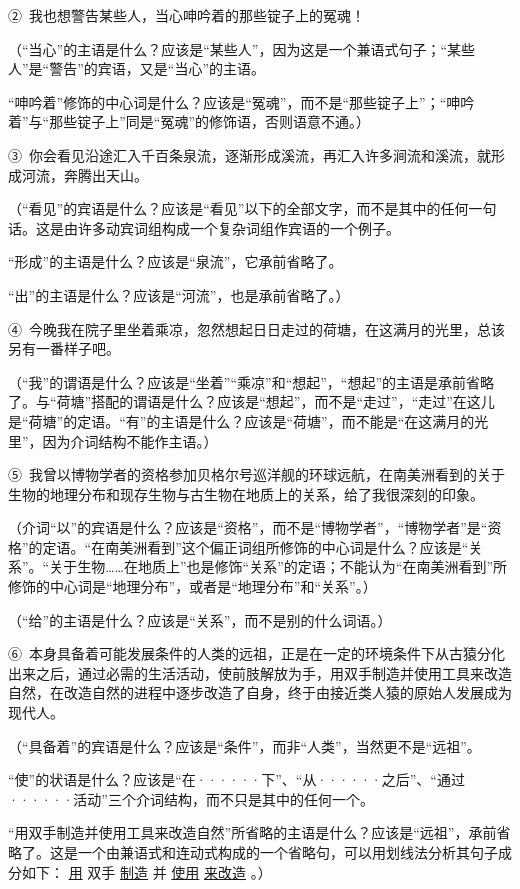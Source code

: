 ②\ 我也想警告某些人，当心呻吟着的那些锭子上的冤魂！

（“当心”的主语是什么？应该是“某些人”，因为这是一个兼语式句子；“某些人”是“警告”的宾语，又是“当心”的主语。

“呻吟着”修饰的中心词是什么？应该是“冤魂”，而不是“那些锭子上”；“呻吟着”与“那些锭子上”同是“冤魂”的修饰语，否则语意不通。）

③\ 你会看见沿途汇入千百条泉流，逐渐形成溪流，再汇入许多涧流和溪流，就形成河流，奔腾出天山。

（“看见”的宾语是什么？应该是“看见”以下的全部文字，而不是其中的任何一句话。这是由许多动宾词组构成一个复杂词组作宾语的一个例子。

“形成”的主语是什么？应该是“泉流”，它承前省略了。

“出”的主语是什么？应该是“河流”，也是承前省略了。）

④\ 今晚我在院子里坐着乘凉，忽然想起日日走过的荷塘，在这满月的光里，总该另有一番样子吧。

（“我”的谓语是什么？应该是“坐着”“乘凉”和“想起”，“想起”的主语是承前省略了。与“荷塘”搭配的谓语是什么？应该是“想起”，而不是“走过”，“走过”在这儿是“荷塘”的定语。“有”的主语是什么？应该是“荷塘”，而不能是“在这满月的光里”，因为介词结构不能作主语。）

⑤\ 我曾以博物学者的资格参加贝格尔号巡洋舰的环球远航，在南美洲看到的关于生物的地理分布和现存生物与古生物在地质上的关系，给了我很深刻的印象。

（介词“以”的宾语是什么？应该是“资格”，而不是“博物学者”，“博物学者”是“资格”的定语。“在南美洲看到”这个偏正词组所修饰的中心词是什么？应该是“关系”。“关于生物……在地质上”也是修饰“关系”的定语；不能认为“在南美洲看到”所修饰的中心词是“地理分布”，或者是“地理分布”和“关系”。）

（“给”的主语是什么？应该是“关系”，而不是别的什么词语。）

⑥\ 本身具备着可能发展条件的人类的远祖，正是在一定的环境条件下从古猿分化出来之后，通过必需的生活活动，使前肢解放为手，用双手制造并使用工具来改造自然，在改造自然的进程中逐步改造了自身，终于由接近类人猿的原始人发展成为现代人。

（“具备着”的宾语是什么？应该是“条件”，而非“人类”，当然更不是“远祖”。

“使”的状语是什么？应该是“在······下”、“从······之后”、“通过······活动”三个介词结构，而不只是其中的任何一个。

“用双手制造并使用工具来改造自然”所省略的主语是什么？应该是“远祖”，承前省略了。这是一个由兼语式和连动式构成的一个省略句，可以用划线法分析其句子成分如下：
\uline{用}
双手
\uline{制造}
并
\uline{使用}
\uline{来改造}
。）

